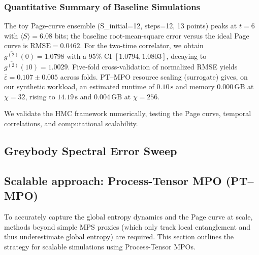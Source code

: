 \documentclass[11pt,a4paper]{article}
\newcommand{\HMC}{\textsc{HMC}\xspace}
\theoremstyle{plain}
\theoremstyle{definition}
\theoremstyle{remark}
\providecommand{\valPageRMSE}{0.0462}
\providecommand{\valCVMean}{0.107}
\providecommand{\valCVStd}{0.005}
\providecommand{\valRuntimeLow}{0.10}
\providecommand{\valMemLow}{0.000}
\providecommand{\valRuntimeHigh}{14.19}
\providecommand{\valMemHigh}{0.004}
\begin{document}
\subsubsection{Quantitative Summary of Baseline Simulations}
The toy Page-curve ensemble (S\_initial=12, steps=12, 13 points) peaks at $t=6$ with $\langle S\rangle=6.08$ bits;
the baseline root-mean-square error versus the ideal Page curve is $\mathrm{RMSE}=\valPageRMSE$.
For the two-time correlator, we obtain $\overline{g^{(2)}}(0)=1.0798$ with a 95\% CI $[1.0794,1.0803]$, decaying to
$\overline{g^{(2)}}(10)=1.0029$.
Five-fold cross-validation of normalized RMSE yields
$\bar{\varepsilon}=\valCVMean \pm \valCVStd$ across folds.
PT--MPO resource scaling (surrogate) gives, on our synthetic workload, an estimated runtime of $\valRuntimeLow\,\mathrm{s}$ and
memory $\valMemLow\,\mathrm{GB}$ at $\chi=32$, rising to $\valRuntimeHigh\,\mathrm{s}$ and $\valMemHigh\,\mathrm{GB}$ at $\chi=256$.

We validate the \HMC{} framework numerically, testing the Page curve, temporal correlations, and computational scalability.

% 
\subsection{Greybody Spectral Error Sweep}
\label{sec:greybody-sweep}

\subsection{Scalable approach: Process-Tensor MPO (PT--MPO)}

\label{ssec:ptmpo}
To accurately capture the global entropy dynamics and the Page curve at scale, methods beyond simple MPS proxies (which only track local entanglement and thus underestimate global entropy) are required.
This section outlines the strategy for scalable simulations using Process-Tensor MPOs.
\end{document}

